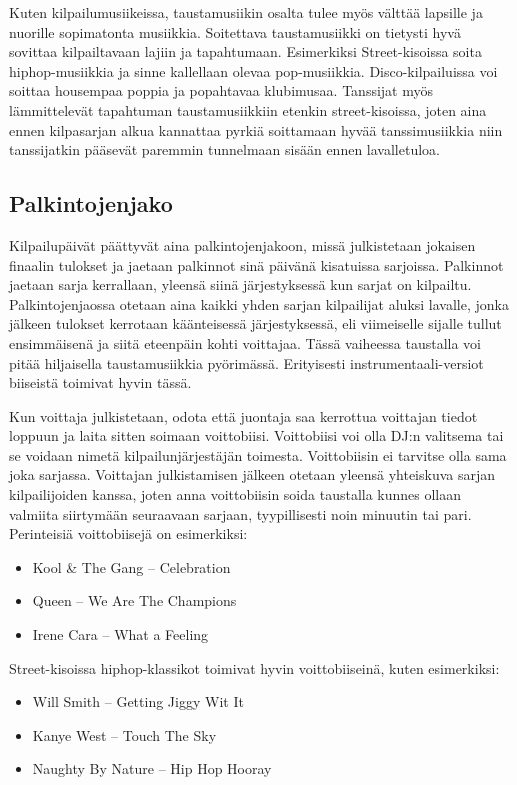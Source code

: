 \documentclass[12pt, a4paper, oneside]{article}
\begin{document}
Kuten kilpailumusiikeissa,
taustamusiikin osalta tulee myös välttää lapsille ja nuorille sopimatonta musiikkia.
Soitettava taustamusiikki on tietysti hyvä sovittaa kilpailtavaan lajiin ja tapahtumaan.
Esimerkiksi Street-kisoissa soita hiphop-musiikkia ja sinne kallellaan olevaa pop-musiikkia.
Disco-kilpailuissa voi soittaa housempaa poppia ja popahtavaa klubimusaa.
Tanssijat myös lämmittelevät tapahtuman taustamusiikkiin etenkin street-kisoissa,
joten aina ennen kilpasarjan alkua kannattaa pyrkiä soittamaan hyvää tanssimusiikkia niin tanssijatkin pääsevät paremmin tunnelmaan sisään ennen lavalletuloa.

\subsection{Palkintojenjako}

Kilpailupäivät päättyvät aina palkintojenjakoon,
missä julkistetaan jokaisen finaalin tulokset ja jaetaan palkinnot sinä päivänä kisatuissa sarjoissa.
Palkinnot jaetaan sarja kerrallaan,
yleensä siinä järjestyksessä kun sarjat on kilpailtu.
Palkintojenjaossa otetaan aina kaikki yhden sarjan kilpailijat aluksi lavalle,
jonka jälkeen tulokset kerrotaan käänteisessä järjestyksessä,
eli viimeiselle sijalle tullut ensimmäisenä ja siitä eteenpäin kohti voittajaa.
Tässä vaiheessa taustalla voi pitää hiljaisella taustamusiikkia pyörimässä.
Erityisesti instrumentaali-versiot biiseistä toimivat hyvin tässä.

Kun voittaja julkistetaan,
odota että juontaja saa kerrottua voittajan tiedot loppuun ja laita sitten soimaan voittobiisi.
Voittobiisi voi olla DJ:n valitsema tai se voidaan nimetä kilpailunjärjestäjän toimesta.
Voittobiisin ei tarvitse olla sama joka sarjassa.
Voittajan julkistamisen jälkeen otetaan yleensä yhteiskuva sarjan kilpailijoiden kanssa,
joten anna voittobiisin soida taustalla kunnes ollaan valmiita siirtymään seuraavaan sarjaan,
tyypillisesti noin minuutin tai pari.
Perinteisiä voittobiisejä on esimerkiksi:
\begin{itemize}[nosep]
    \item Kool \& The Gang -- Celebration
    \item Queen -- We Are The Champions
    \item Irene Cara -- What a Feeling
\end{itemize}

Street-kisoissa hiphop-klassikot toimivat hyvin voittobiiseinä,
kuten esimerkiksi:
\begin{itemize}[nosep]
    \item Will Smith -- Getting Jiggy Wit It
    \item Kanye West -- Touch The Sky
    \item Naughty By Nature -- Hip Hop Hooray
\end{itemize}
\end{document}
